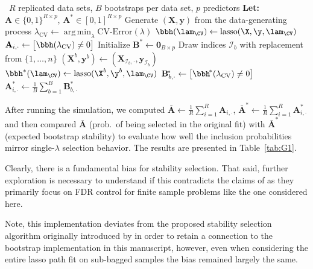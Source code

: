 \begin{algorithm}[!ht]
\caption{Bootstrap Stability Selection at a \emph{single} CV-chosen $\lambda$}
\label{alg:singlelambda}
\begin{algorithmic}[1]
\Require\ $R$ replicated data sets, $B$ bootstraps per data set,
          $p$ predictors
\Statex \textbf{Let:}
  $\mathbf A \in\{0,1\}^{R\times p}$, $\mathbf A^{\!*}\in[0,1]^{R\times p}$
%
  \State Generate $(\mathbf X,\mathbf y)$ from the data-generating process
  \State $\lambda_{\text{CV}}\leftarrow
         \operatorname*{arg\,min}_{\lambda}\text{CV‐Error}(\lambda)$
  \State $\bbh (\lam_{\CV}) \gets \text{lasso}(\X, \y, \lam_{\CV})$
  \State $\mathbf A_{i,\cdot}\gets\bigl[\bbh(\lambda_{\text{CV}})\neq 0\bigr]$
  \State Initialize $\mathbf B^{\!*}\gets\mathbf 0_{B\times p}$
                          
     \State Draw indices $\mathcal I_b$ with replacement from $\{1,\dots,n\}$
     \State $(\mathbf X^{b},\mathbf y^{b})\gets
            (\mathbf X_{\mathcal I_b,\cdot},\mathbf y_{\mathcal I_b})$
     \State $\bbh^* (\lam_{\CV}) \gets \text{lasso}(\X^{b}, \y^{b}, \lam_{\CV})$
     \State $\mathbf B^{\!*}_{b,\cdot}\gets
            \bigl[\bbh^{\!*}(\lambda_{\text{CV}})\neq 0\bigr]$
  \EndFor
  \State $\mathbf A^{\!*}_{i,\cdot}\gets
         \tfrac1B\sum_{b=1}^{B}\mathbf B^{\!*}_{b,\cdot}$
\EndFor
\end{algorithmic}
\end{algorithm}

After running the simulation, we computed $\bar{\mathbf A}\gets\tfrac1R\sum_{i=1}^{R}\mathbf A_{i,\cdot}$,  \; $\bar{\mathbf A}^{\!*}\gets\tfrac1R\sum_{i=1}^{R}\mathbf A^{\!*}_{i,\cdot}$ and then compared $\bar{\mathbf A}$ (prob.\ of being selected in the original fit) with $\bar{\mathbf A}^{\!*}$ (expected bootstrap stability) to evaluate how well the inclusion probabilities mirror single-$\lambda$ selection behavior. The results are presented in Table~\ref{tab:G1}.

\begin{table}[hbtp]
  \centering
  
  \caption{\label{tab:G1} Results for simulation described in Supplement~\ref{sup:stability} showing that stability selection also suffers from bootstrap bias. Original selection provides the empirical selection probabilities for the 4 parameters while Bootstrap stability gives the bootstrap estimate for selection.}
\end{table}

Clearly, there is a fundamental bias for stability selection. That said, further exploration is necessary to understand if this contradicts the claims of \cite{Meinshausen2010} as they primarily focus on FDR control for finite sample problems like the one considered here.

Note, this implementation deviates from the proposed stability selection algorithm originally introduced by \cite{Meinshausen2010} in order to retain a connection to the bootstrap implementation in this manuscript, however, even when considering the entire lasso path fit on sub-bagged samples the bias remained largely the same.

